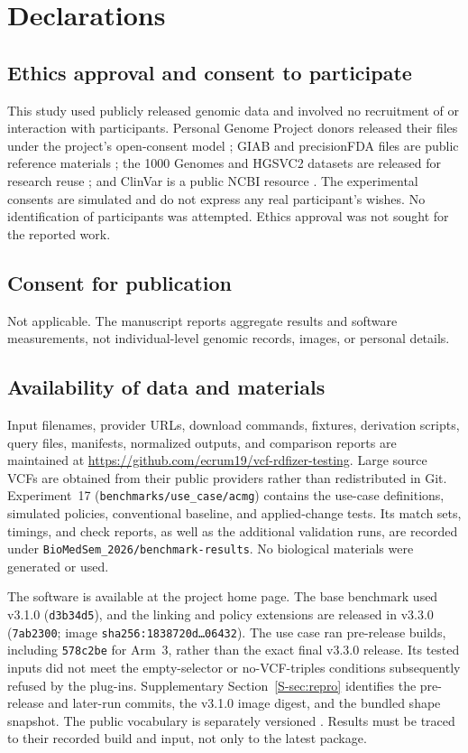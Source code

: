 \documentclass[pdflatex,sn-mathphys-num]{sn-jnl}
\begin{document}
\section*{Declarations}
\subsection*{Ethics approval and consent to participate}
This study used publicly released genomic data and involved no recruitment of or interaction with participants.
Personal Genome Project donors released their files under the project's open-consent model \cite{personal_genome_proj}; GIAB and precisionFDA files are public reference materials \cite{nist_gib_2025,giab_v421_2022}; the 1000 Genomes and HGSVC2 datasets are released for research reuse \cite{thousand_genomes_2015,byrska2022highcoverage,hgsvc_2021}; and ClinVar is a public NCBI resource \cite{clinvar_vcf}.
The experimental consents are simulated and do not express any real participant's wishes.
No identification of participants was attempted.
Ethics approval was not sought for the reported work.

\subsection*{Consent for publication}
Not applicable.
The manuscript reports aggregate results and software measurements, not individual-level genomic records, images, or personal details.

\subsection*{Availability of data and materials}
Input filenames, provider URLs, download commands, fixtures, derivation scripts, query files, manifests, normalized outputs, and comparison reports are maintained at \url{https://github.com/ecrum19/vcf-rdfizer-testing}.
Large source VCFs are obtained from their public providers rather than redistributed in Git.
Experiment~17 (\texttt{benchmarks/use\_case/acmg}) contains the use-case definitions, simulated policies, conventional baseline, and applied-change tests.
Its match sets, timings, and check reports, as well as the additional validation runs, are recorded under \texttt{BioMedSem\_2026/benchmark-results}.
No biological materials were generated or used.

The software is available at the project home page.
The base benchmark used v3.1.0 (\texttt{d3b34d5}), and the linking and policy extensions are released in v3.3.0 (\texttt{7ab2300}; image \texttt{sha256:1838720d\ldots06432}).
The use case ran pre-release builds, including \texttt{578c2be} for Arm~3, rather than the exact final v3.3.0 release.
Its tested inputs did not meet the empty-selector or no-VCF-triples conditions subsequently refused by the plug-ins.
Supplementary Section~\ref{S-sec:repro} identifies the pre-release and later-run commits, the v3.1.0 image digest, and the bundled shape snapshot.
The public vocabulary is separately versioned \cite{vcfc210}.
Results must be traced to their recorded build and input, not only to the latest package.
\end{document}
